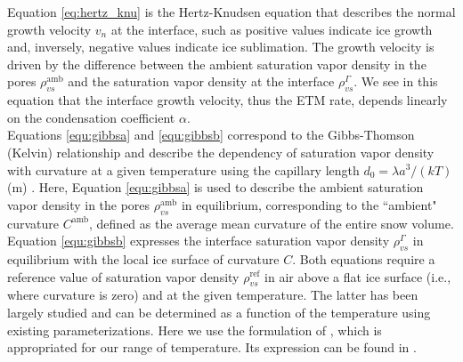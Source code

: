 \documentclass[draft,ms]{agujournal2019}
\begin{document}
\noindent Equation \eqref{eq:hertz_knu} is the Hertz-Knudsen equation that describes the normal growth velocity $v_n$ at the interface, such as positive values indicate ice growth and, inversely, negative values indicate ice sublimation. The growth velocity is driven by the difference between the ambient saturation vapor density in the pores $\rho_{vs}^{\mathrm{amb}}$ and the saturation vapor density at the interface $\rho_{vs}^{\Gamma}$. We see in this equation that the interface growth velocity, thus the ETM rate, depends linearly on the condensation coefficient $\alpha$.\\

\noindent Equations \eqref{equ:gibbsa} and \eqref{equ:gibbsb} correspond to the Gibbs-Thomson (Kelvin) relationship and describe the dependency of saturation vapor density with curvature at a given temperature using the capillary length $d_0 = \lambda a^3/(k T)$ (m) \cite{kaempfer_phase-field_2009}. Here, Equation \eqref{equ:gibbsa} is used to describe the ambient saturation vapor density in the pores $\rho_{vs}^{\mathrm{amb}}$ in equilibrium, corresponding to the ``ambient" curvature $C^{\mathrm{amb}}$, defined as the average mean curvature of the entire snow volume. Equation \eqref{equ:gibbsb} expresses the interface saturation vapor density $\rho_{vs}^{\Gamma}$ in equilibrium with the local ice surface of curvature $C$. Both equations require a reference value of saturation vapor density $\rho_{vs}^\mathrm{ref}$ in air above a flat ice surface (i.e., where curvature is zero) and at the given temperature. The latter has been largely studied and can be determined as a function of the temperature using existing parameterizations. Here we use the formulation of , which is appropriated for our range of temperature. Its expression can be found in .
\end{document}

